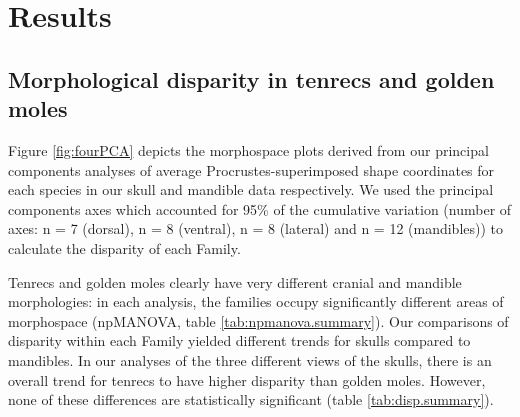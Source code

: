\documentclass[12pt,a4paper]{article}
\begin{document}

\section{Results}


\subsection{Morphological disparity in tenrecs and golden moles} 
 
	Figure  \ref{fig:fourPCA} depicts the morphospace plots derived from our principal components analyses of average Procrustes-superimposed shape coordinates for each species in our skull and mandible data respectively. We used the principal components axes which accounted for 95\% of the cumulative variation (number of axes: n = 7 (dorsal), n = 8 (ventral), n = 8 (lateral) and n = 12 (mandibles)) to calculate the disparity of each Family. 

	Tenrecs and golden moles clearly have very different cranial and mandible morphologies: in each analysis, the families occupy significantly different areas of morphospace (npMANOVA, table \ref{tab:npmanova.summary}). Our comparisons of disparity within each Family yielded different trends for skulls compared to mandibles. In our analyses of the three different views of the skulls, there is an overall trend for tenrecs to have higher disparity than golden moles. However, none of these differences are statistically significant (table \ref{tab:disp.summary}). 
	
	
\end{document}
